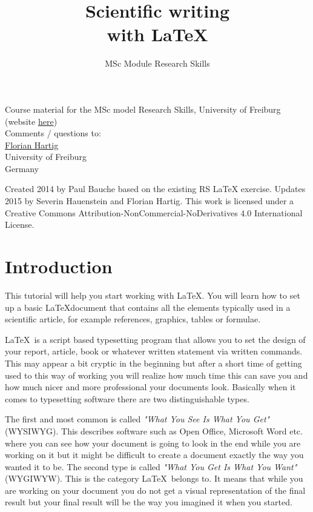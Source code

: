 \documentclass[justified, notoc]{tufte-book} %
\title{Scientific writing\\with LaTeX}
\author{MSc Module Research Skills}
\begin{document}
\let\cleardoublepage\clearpage
\maketitle

\thispagestyle{empty}
\null


\begin{fullwidth}
Course material for the MSc model Research Skills, University of Freiburg (website \href{http://florianhartig.github.io/ResearchSkills/}{here})\\[0.5cm]
Comments / questions to:\\[0.5cm]
\href{https://florianhartig.wordpress.com/}{Florian Hartig}\\
University of Freiburg\\
Germany


\end{fullwidth}


\vfill
\begin{fullwidth}
Created 2014 by Paul Bauche based on the existing RS LaTeX exercise. Updates 2015 by Severin Hauenstein and Florian Hartig. This work is licensed under a Creative Commons Attribution-NonCommercial-NoDerivatives 4.0 International License.
\end{fullwidth}

\tableofcontents

\chapter{Introduction}

This tutorial will help you start working with \LaTeX. You will learn how to set up a basic  \LaTeX document that contains all the elements typically used in a scientific article, for example references, graphics, tables or formulae. 

 \LaTeX\ is a script based typesetting program that allows you to set the design of your report, article, book or whatever written statement via written commands. This may appear a bit cryptic in the beginning but after a short time of getting used to this way of working you will realize how much time this can save you and how much nicer and more professional your documents look. Basically when it comes to typesetting software there are two distinguishable types.
 
The first and most common is called \emph{"What You See Is What You Get"} (WYSIWYG). This describes software such as Open Office, Microsoft Word etc. where you can see how your document is going to look in the end while you are working on it but it might be difficult to create a document exactly the way you wanted it to be. The second type is called \emph{"What You Get Is What You Want"}(WYGIWYW). This is the category \LaTeX\ belongs to. It means that while you are working on your  document you do not get a visual representation of the final result but your final result will be the way you imagined it when you started.  	
\end{document}
